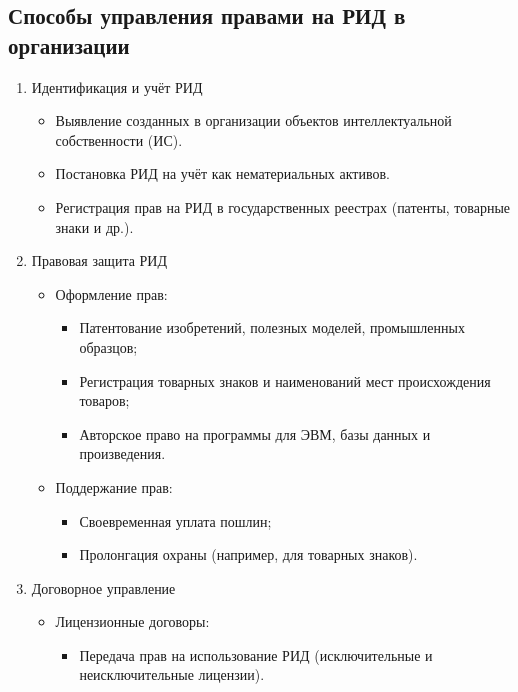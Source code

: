 \pagebreak
\subsection{Способы управления правами на РИД в организации}

\begin{enumerate}
    \item Идентификация и учёт РИД
        \begin{itemize}
            \item Выявление созданных в организации объектов интеллектуальной собственности (ИС).
            \item Постановка РИД на учёт как нематериальных активов.
            \item Регистрация прав на РИД в государственных реестрах (патенты, товарные знаки и др.).
        \end{itemize}
    \item Правовая защита РИД
        \begin{itemize}
            \item Оформление прав:
            \begin{itemize}
                \item Патентование изобретений, полезных моделей, промышленных образцов;
                \item Регистрация товарных знаков и наименований мест происхождения товаров;
                \item Авторское право на программы для ЭВМ, базы данных и произведения.
            \end{itemize}
            \item Поддержание прав:
            \begin{itemize}
                \item Своевременная уплата пошлин;
                \item Пролонгация охраны (например, для товарных знаков).
            \end{itemize}
        \end{itemize}
    \item Договорное управление
        \begin{itemize}
            \item Лицензионные договоры:
            \begin{itemize}
                \item Передача прав на использование РИД (исключительные и неисключительные лицензии).
            \end{itemize}

\end{itemize}
\end{enumerate}
